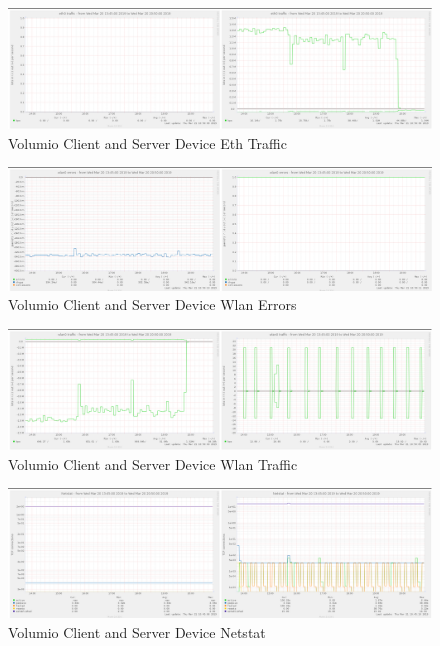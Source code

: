 \documentclass[11pt,a4paper,headinclude=false,footinclude=false]{scrreprt}
\begin{document}
\begin{figure}[H]
\includegraphics{ResultsAndAnalysis/VolumioServerTestImages/011VolumioEth0Traffic.png}
\centering
\caption{Volumio Client and Server Device Eth Traffic}
\label{VolumioEthTraffic}
\end{figure}

\begin{figure}[H]
\includegraphics{ResultsAndAnalysis/VolumioServerTestImages/022VolumioWlan0Errors.png}
\centering
\caption{Volumio Client and Server Device Wlan Errors}
\label{VolumioWlanError}
\end{figure}

\begin{figure}[H]
\includegraphics{ResultsAndAnalysis/VolumioServerTestImages/023VolumioWlan0Traffic.png}
\centering
\caption{Volumio Client and Server Device Wlan Traffic}
\label{VolumioWlanTraffic}
\end{figure}

\begin{figure}[H]
\includegraphics{ResultsAndAnalysis/VolumioServerTestImages/018VolumioNetstat.png}
\centering
\caption{Volumio Client and Server Device Netstat}
\label{VolumioNetstat}
\end{figure}
\end{document}
